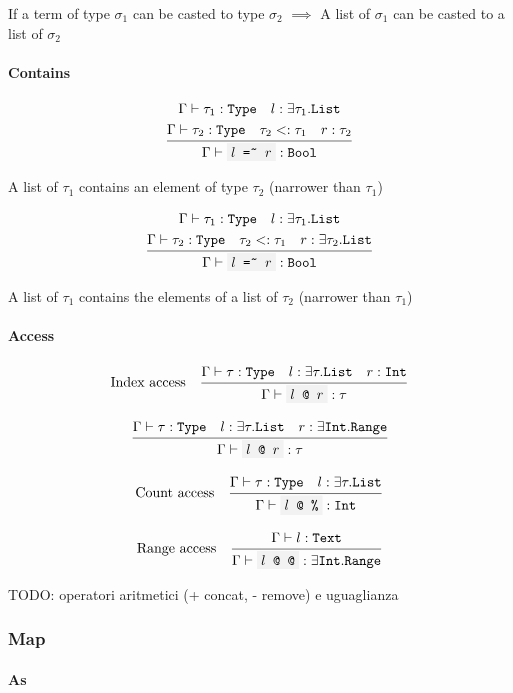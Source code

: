\documentclass[11pt]{report}
\newcommand{\infrule}[3][gathered]{\frac{\begin{#1}#2\end{#1}}{\begin{gathered}#3\end{gathered}}}
\newcommand{\then}{\vdash}
\newcommand{\code}[1]{\texttt{\colorbox{gray!10}{#1}}}
\newcommand{\narr}{<:}
\newcommand{\Type}{\texttt{Type}}
\newcommand{\Bool}{\texttt{Bool}}
\newcommand{\Text}{\texttt{Text}}
\newcommand{\Int}{\texttt{Int}}
\newcommand{\List}{\texttt{List}}
\newcommand{\Range}{\texttt{Range}}
\newcommand{\Env}{\Gamma}
\theoremstyle{definition}
\newcommand{\comment}[1]{
	\parbox{0.9\linewidth}{\color{black!30}\small\sffamily #1}
}
\begin{document}
If a term of type $\sigma_1$ can be casted to type $\sigma_2$ $\implies$ A list of
$\sigma_1$ can be casted to a list of $\sigma_2$

\paragraph{Contains}

\[
	\infrule{
		\Env\then \tau_1:\Type \quad l:\exists\tau_1.\List \\*
		\Env\then \tau_2:\Type \quad \tau_2 \narr \tau_1 \quad r:\tau_2
	}{
		\Env\then \code{$l$ =\~{} $r$} : \Bool
	}
\]

A list of $\tau_1$ contains an element of type $\tau_2$ (narrower than $\tau_1$)

\[
	\infrule{
		\Env\then \tau_1:\Type \quad l:\exists\tau_1.\List\\*
		\Env\then \tau_2:\Type \quad \tau_2 \narr \tau_1 \quad r:\exists\tau_2.\List
	}{
		\Env\then \code{$l$ =\~{} $r$} : \Bool
	}
\]

A list of $\tau_1$ contains the elements of a list of $\tau_2$ (narrower than
$\tau_1$)

\paragraph{Access}

\[
	\text{Index access}\quad
	\infrule{
		\Env\then \tau:\Type
		\quad l:\exists\tau.\List
		\quad r:\Int
	}{
		\Env\then \code{$l$ @ $r$}: \tau
	}
\]

\[
	\infrule{
		\Env\then \tau : \Type
		\quad l:\exists\tau.\List
		\quad r:\exists\Int.\Range
	}{
		\Env\then \code{$l$ @ $r$}: \tau
	}
\]

\[
	\text{Count access}\quad
	\infrule{
		\Env\then \tau:\Type \quad l:\exists\tau.\List
	}{
		\Env\then \code{$l$ @ \%}: \Int
	}
\]

\[
	\text{Range access}\quad
	\infrule{
		\Env\then l:\Text
	}{
		\Env\then \code{$l$ @ @}: \exists\Int.\Range
	}
\]

\comment{TODO: operatori aritmetici (+ concat, - remove) e uguaglianza}

\subsubsection{Map}

\paragraph{As}
\end{document}
